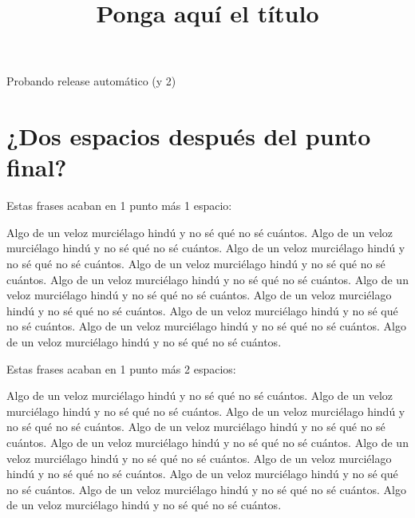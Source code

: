 \documentclass[a4paper, 11pt]{article}
\title{Ponga aquí el título}
\begin{document}
Probando release automático (y 2)




\newpage
\section{¿Dos espacios después del punto final?}

\noindent
Estas frases acaban en 1 punto más 1 espacio:

Algo de un veloz murciélago hindú y no sé qué no sé cuántos. Algo de un veloz murciélago hindú y no sé qué no sé cuántos. Algo de un veloz murciélago hindú y no sé qué no sé cuántos. Algo de un veloz murciélago hindú y no sé qué no sé cuántos. Algo de un veloz murciélago hindú y no sé qué no sé cuántos. Algo de un veloz murciélago hindú y no sé qué no sé cuántos. Algo de un veloz murciélago hindú y no sé qué no sé cuántos. Algo de un veloz murciélago hindú y no sé qué no sé cuántos. Algo de un veloz murciélago hindú y no sé qué no sé cuántos. Algo de un veloz murciélago hindú y no sé qué no sé cuántos.

\smallskip
\noindent
Estas frases acaban en 1 punto más 2 espacios:

Algo de un veloz murciélago hindú y no sé qué no sé cuántos.  Algo de un veloz murciélago hindú y no sé qué no sé cuántos.  Algo de un veloz murciélago hindú y no sé qué no sé cuántos.  Algo de un veloz murciélago hindú y no sé qué no sé cuántos.  Algo de un veloz murciélago hindú y no sé qué no sé cuántos.  Algo de un veloz murciélago hindú y no sé qué no sé cuántos.  Algo de un veloz murciélago hindú y no sé qué no sé cuántos.  Algo de un veloz murciélago hindú y no sé qué no sé cuántos.  Algo de un veloz murciélago hindú y no sé qué no sé cuántos.  Algo de un veloz murciélago hindú y no sé qué no sé cuántos.
\end{document}
